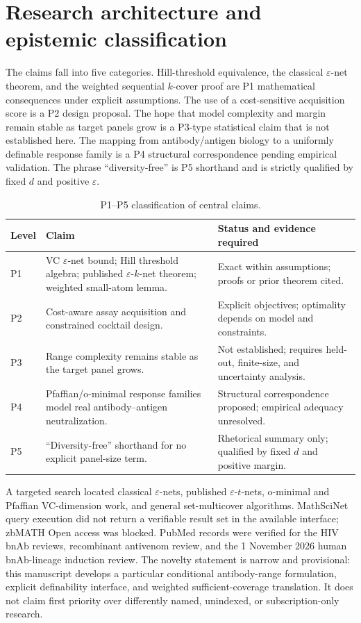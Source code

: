 \documentclass[11pt,a4paper]{article}
\newcommand{\eps}{\varepsilon}
\begin{document}
\section{Research architecture and epistemic classification}
The claims fall into five categories. Hill-threshold equivalence, the classical $\eps$-net theorem, and the weighted sequential $k$-cover proof are P1 mathematical consequences under explicit assumptions. The use of a cost-sensitive acquisition score is a P2 design proposal. The hope that model complexity and margin remain stable as target panels grow is a P3-type statistical claim that is not established here. The mapping from antibody/antigen biology to a uniformly definable response family is a P4 structural correspondence pending empirical validation. The phrase “diversity-free” is P5 shorthand and is strictly qualified by fixed $d$ and positive $\eps$.

\begin{table}[t]\centering\small\caption{P1--P5 classification of central claims.}\begin{tabularx}{\linewidth}{p{.12\linewidth}p{.43\linewidth}X}\toprule Level&Claim&Status and evidence required\\\midrule P1&VC $\eps$-net bound; Hill threshold algebra; published $\eps$-$k$-net theorem; weighted small-atom lemma.&Exact within assumptions; proofs or prior theorem cited.\\ P2&Cost-aware assay acquisition and constrained cocktail design.&Explicit objectives; optimality depends on model and constraints.\\ P3&Range complexity remains stable as the target panel grows.&Not established; requires held-out, finite-size, and uncertainty analysis.\\ P4&Pfaffian/o-minimal response families model real antibody--antigen neutralization.&Structural correspondence proposed; empirical adequacy unresolved.\\ P5&“Diversity-free” shorthand for no explicit panel-size term.&Rhetorical summary only; qualified by fixed $d$ and positive margin.\\\bottomrule\end{tabularx}\label{tab:epistemic}\end{table}

A targeted search located classical $\eps$-nets, published $\eps$-$t$-nets, o-minimal and Pfaffian VC-dimension work, and general set-multicover algorithms. MathSciNet query execution did not return a verifiable result set in the available interface; zbMATH Open access was blocked. PubMed records were verified for the HIV bnAb reviews, recombinant antivenom review, and the 1 November 2026 human bnAb-lineage induction review. The novelty statement is narrow and provisional: this manuscript develops a particular conditional antibody-range formulation, explicit definability interface, and weighted sufficient-coverage translation. It does not claim first priority over differently named, unindexed, or subscription-only research.
\end{document}
